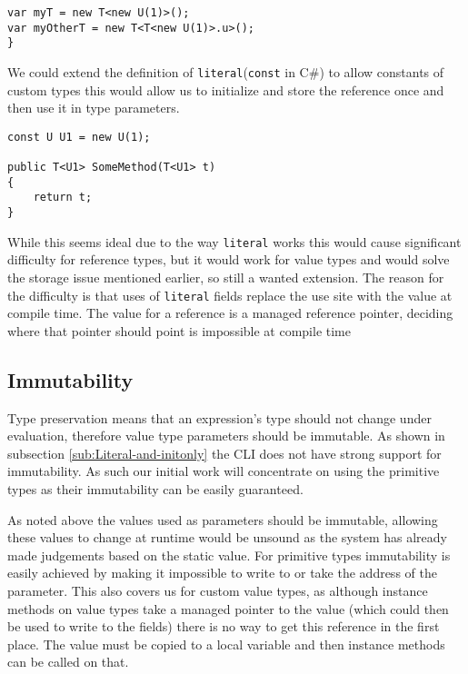 \begin{lstlisting}[caption={An issue with reference values},keywordstyle={\color{blue}},language=sharpc]
var myT = new T<new U(1)>();
var myOtherT = new T<T<new U(1)>.u>();
}
\end{lstlisting}

We could extend the definition of \texttt{literal}(\texttt{const} in C\#) to allow constants of custom types this would allow us to 
initialize and store the reference once and then use it in type parameters.

\begin{lstlisting}[caption={Literal references},keywordstyle={\color{blue}},language=sharpc]
const U U1 = new U(1);

public T<U1> SomeMethod(T<U1> t)
{
	return t;
}
\end{lstlisting}

While this seems ideal due to the way \texttt{literal} works this would cause significant difficulty for reference types,
but it would work for value types and would solve the storage issue mentioned earlier, so still a wanted extension.
The reason for the difficulty is that uses of \texttt{literal} fields replace the use site with the value at compile time. 
The value for a reference is a managed reference pointer, deciding where that pointer should point is impossible at compile time

\subsection{Immutability}

Type preservation means that an expression's type should not change
under evaluation, therefore value type parameters should be immutable.
As shown in subsection \ref{sub:Literal-and-initonly} the CLI does
not have strong support for immutability. As such our initial work
will concentrate on using the primitive types as their immutability
can be easily guaranteed.

As noted above the values used as parameters should be immutable, allowing these values to change at runtime would be unsound 
as the system has already made judgements based on the static value. For primitive types immutability is easily achieved by making 
it impossible to write to or take the address of the parameter. This also covers us for custom value types, as although instance 
methods on value types take a managed pointer to the value (which could then be used to write to the fields) there is no way to
get this reference in the first place. The value must be copied to a local variable and then instance methods can be called on that.

